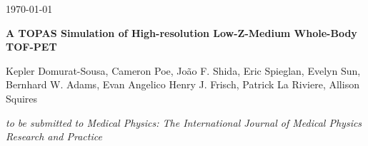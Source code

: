 \documentclass[12pt]{article}
\begin{document}
\pagestyle{plain}
%
\begin{flushright}
\today
\end{flushright}

%
%
\begin{center}
{\Large\bf A TOPAS Simulation of High-resolution Low-Z-Medium Whole-Body TOF-PET}\\
\vskip 0.3in

Kepler Domurat-Sousa, Cameron Poe, Jo\~ao F. Shida, Eric Spieglan, Evelyn Sun, Bernhard W.
Adams, Evan Angelico  Henry J. Frisch, Patrick La Riviere, Allison
Squires

{\it to be submitted to Medical Physics: The International Journal of
Medical Physics Research and Practice}
\end{center}

\vskip 0.5in
\end{document}
